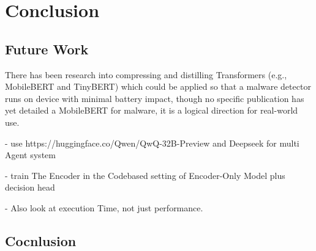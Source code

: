 \chapter{Conclusion}

\label{Conclusion} %


\section{Future Work}
There has been research into compressing and distilling Transformers 
(e.g., MobileBERT and TinyBERT) which could be applied so that a malware detector runs 
on device with minimal battery impact, though no specific publication has yet detailed a MobileBERT 
for malware, it is a logical direction for real-world use.

- use https://huggingface.co/Qwen/QwQ-32B-Preview and Deepseek for multi Agent system

- train The Encoder in the Codebased setting of Encoder-Only Model plus decision head

- Also look at execution Time, not just performance.

\section{Cocnlusion}